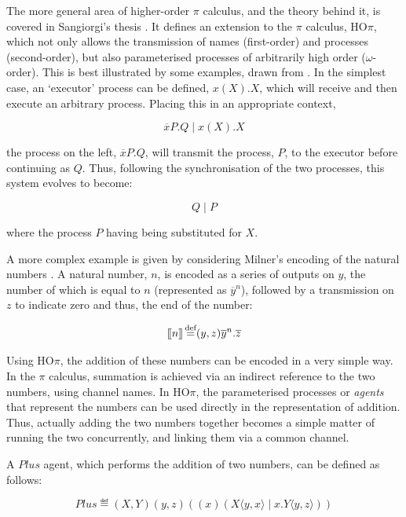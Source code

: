 The more general area of higher-order $\pi$ calculus, and the theory
behind it, is covered in Sangiorgi's thesis \cite{sangiorgi:phd}.  It
defines an extension to the $\pi$ calculus, HO$\pi$, which not only
allows the transmission of names (first-order) and processes
(second-order), but also parameterised processes of arbitrarily high
order ($\omega$-order).  This is best illustrated by some examples,
drawn from \cite{sangiorgi:phd}.  In the simplest case, an `executor'
process can be defined, $x(X).X$, which will receive and then execute an
arbitrary process.  Placing this in an appropriate context,

\begin{equation}
\overline{x}P.Q\;|\;x(X).X
\end{equation}

\noindent the process on the left, $\overline{x}P.Q$, will transmit
the process, $P$, to the executor before continuing as $Q$.  Thus,
following the synchronisation of the two processes, this system
evolves to become:

\begin{equation}
Q\;|\;P
\end{equation}

\noindent where the process $P$ having being substituted for $X$.  

A more complex example is given by considering Milner's encoding of
the natural numbers \cite{milner:93polyadic}.  A natural number, $n$,
is encoded as a series of outputs on $y$, the number of which is equal
to $n$ (represented as $\overline{y}^n$), followed by a transmission
on $z$ to indicate zero and thus, the end of the number:

\begin{equation}
[\hspace{-0.3ex}[ n ]\hspace{-0.3ex}] \operatorname{\stackrel{\textrm{def}}{=}} (y,z)\overline{y}^n.\overline{z}
\end{equation}

\noindent Using HO$\pi$, the addition of these numbers can be encoded
in a very simple way.  In the $\pi$ calculus, summation is achieved
via an indirect reference to the two numbers, using channel names.  In
HO$\pi$, the parameterised processes or \emph{agents} that represent
the numbers can be used directly in the representation of addition.
Thus, actually adding the two numbers together becomes a simple matter
of running the two concurrently, and linking them via a common
channel.

A $Plus$ agent, which performs the addition of two numbers, can be
defined as follows:

\begin{equation}
Plus \eqdef (X,Y)(y,z)((x)(X\langle y,x\rangle \;|\;x.Y\langle y,z\rangle ))
\end{equation}


